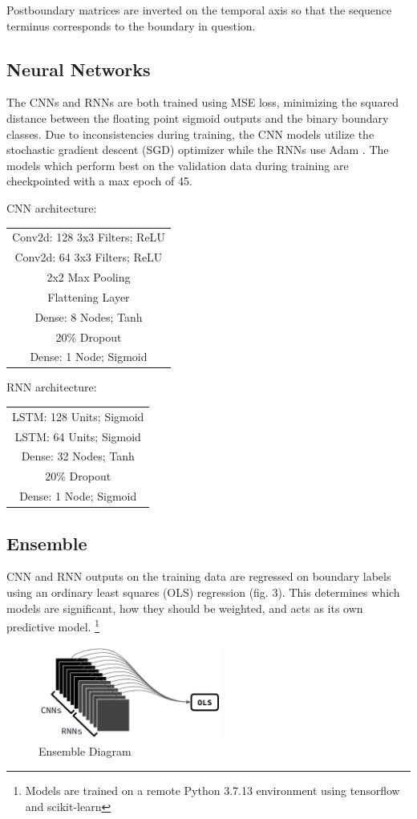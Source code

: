 \documentclass[conference]{IEEEtran}
\begin{document}
Postboundary matrices are inverted on the temporal axis so that the sequence terminus corresponds to the boundary in question.


\subsection{Neural Networks}\label{AA}
The CNNs and RNNs are both trained using MSE loss, minimizing the squared distance between the floating point sigmoid outputs and the binary boundary classes. Due to inconsistencies during training, the CNN models utilize the stochastic gradient descent (SGD) optimizer while the RNNs use Adam \cite{b10}. The models which perform best on the validation data during training are checkpointed with a max epoch of 45.

CNN architecture:
\begin{center}
\begin{tabular}{ c }
Conv2d: 128 3x3 Filters; ReLU\\
Conv2d: 64 3x3 Filters; ReLU\\
2x2 Max Pooling\\
Flattening Layer\\
Dense: 8 Nodes; Tanh\\
20\% Dropout\\
Dense: 1 Node; Sigmoid
\end{tabular}
\end{center}

RNN architecture:
\begin{center}
\begin{tabular}{ c }
LSTM: 128 Units; Sigmoid\\
LSTM: 64 Units; Sigmoid\\
Dense: 32 Nodes; Tanh\\
20\% Dropout\\
Dense: 1 Node; Sigmoid
\end{tabular}
\end{center}

\subsection{Ensemble}\label{AA}
CNN and RNN outputs on the training data are regressed on boundary labels using an ordinary least squares (OLS) regression (fig. 3). This determines which models are significant, how they should be weighted, and acts as its own predictive model. \footnote{Models are trained on a remote Python 3.7.13 environment using tensorflow\cite{b11} and scikit-learn\cite{b12}}
\begin{figure}[htbp]
\centerline{\includegraphics[width=60mm]{diagram_models.png}}
\caption{Ensemble Diagram}
\label{fig}
\end{figure}
\end{document}
